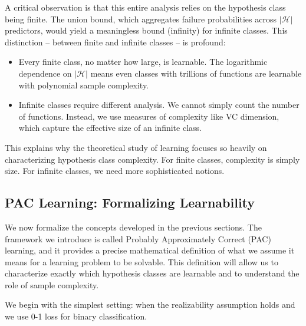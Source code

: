 A critical observation is that this entire analysis relies on the hypothesis class being finite. The union bound, which aggregates failure probabilities across $|\mathcal{H}|$ predictors, would yield a meaningless bound (infinity) for infinite classes. This distinction -- between finite and infinite classes -- is profound:

\begin{itemize}
\item Every finite class, no matter how large, is learnable. The logarithmic dependence on $|\mathcal{H}|$ means even classes with trillions of functions are learnable with polynomial sample complexity.
\item Infinite classes require different analysis. We cannot simply count the number of functions. Instead, we use measures of complexity like VC dimension, which capture the effective size of an infinite class.
\end{itemize}

This explains why the theoretical study of learning focuses so heavily on characterizing hypothesis class complexity. For finite classes, complexity is simply size. For infinite classes, we need more sophisticated notions.



\subsection*{PAC Learning: Formalizing Learnability}

We now formalize the concepts developed in the previous sections. The framework we introduce is called \alert{Probably Approximately Correct} (PAC) learning, and it provides a precise mathematical definition of what we assume it means for a learning problem to be solvable. This definition will allow us to characterize exactly which hypothesis classes are learnable and to understand the role of sample complexity.


We begin with the simplest setting: when the realizability assumption holds and we use 0-1 loss for binary classification.

